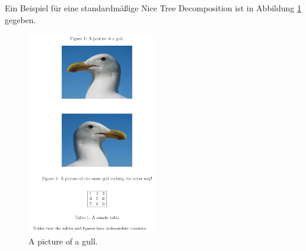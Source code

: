 Ein Beispiel für eine standardmäßige Nice Tree Decomposition ist in Abbildung \ref{fig:ntd} gegeben.

\begin{figure}
\label{fig:ntd}

  \centering
    \includegraphics[width=0.5\textwidth]{pic.png}
  	\caption{A picture of a gull.}
\end{figure}
